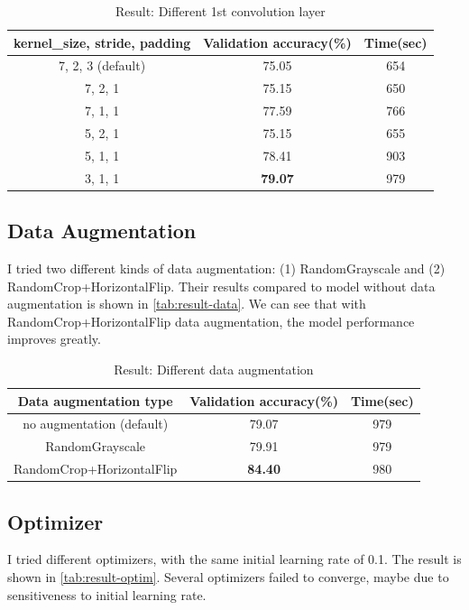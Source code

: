 \documentclass[10pt]{article}
\begin{document}
\begin{table}[htb]
\centering
\caption{Result: Different 1st convolution layer}
\begin{tabular}{c|c|c}
\hline
\textbf{kernel\_size, stride, padding}   & \textbf{Validation accuracy(\%)}   & \textbf{Time(sec)}   \\ \hline
7, 2, 3 (default)     & 75.05   & 654      \\
7, 2, 1   &  75.15     & 650   \\
7, 1, 1       & 77.59    & 766        \\
5, 2, 1      & 75.15    & 655       \\
5, 1, 1        & 78.41  & 903     \\
3, 1, 1  & \textbf{79.07} & 979 \\
\hline
\end{tabular}
\label{tab:result-conv1}
\end{table}

\subsection{Data Augmentation}

I tried two different kinds of data augmentation: (1) RandomGrayscale and (2) RandomCrop+HorizontalFlip. Their results compared to model without data augmentation is shown in \autoref{tab:result-data}. 
We can see that with RandomCrop+HorizontalFlip data augmentation, the model performance improves greatly.

\begin{table}[htb]
\centering
\caption{Result: Different data augmentation}
\begin{tabular}{c|c|c}
\hline
\textbf{Data augmentation type}   & \textbf{Validation accuracy(\%)}   & \textbf{Time(sec)}   \\ \hline
no augmentation (default)     & 79.07   & 979      \\
RandomGrayscale   &  79.91     & 979   \\
RandomCrop+HorizontalFlip      & \textbf{84.40}    & 980        \\
\hline
\end{tabular}
\label{tab:result-data}
\end{table}

\subsection{Optimizer}

I tried different optimizers, with the same initial learning rate of 0.1.
The result is shown in \autoref{tab:result-optim}. Several optimizers failed to converge, maybe due to sensitiveness to initial learning rate.
\end{document}
